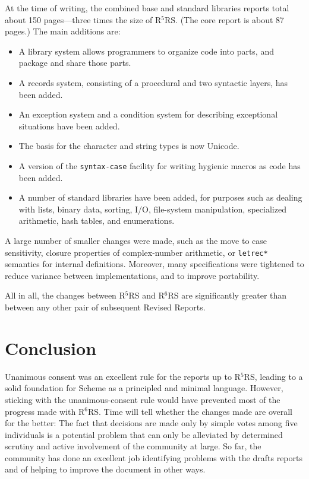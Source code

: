 \documentclass{acm_proc_article-sp}
\newcommand{\rn}[1]{R$^{#1}$RS}
\begin{document}
At the time of writing, the combined base and standard
libraries reports total about 150 pages---three times the size
of \rn{5}.  (The core report is about 87 pages.)  The main additions
are:
%
\begin{itemize}
\item A library system allows programmers to organize code into parts,
  and package and share those parts.
\item A records system, consisting of a procedural and two syntactic
  layers, has been added.
\item An exception system and a condition system for describing
  exceptional situations have been added.
\item The basis for the character and string types is now Unicode.
\item A version of the \texttt{syntax-case} facility for writing
  hygienic macros as code has been added.
\item A number of standard libraries have been added, for purposes
  such as dealing with lists, binary data, sorting, I/O, file-system
  manipulation, specialized arithmetic, hash tables, and enumerations.
\end{itemize}
%
A large number of smaller changes were made, such as the move to case
sensitivity, closure properties of complex-number arithmetic, or
\texttt{letrec*} semantics for internal definitions.  Moreover, many
specifications were tightened to reduce variance between
implementations, and to improve portability.

All in all, the changes between \rn{5} and \rn{6} are significantly
greater than between any other pair of subsequent Revised
Reports.

\section{Conclusion}
\label{sec:conclusion}

Unanimous consent was an excellent rule for the reports up to \rn{5},
leading to a solid foundation for Scheme as a principled and minimal
language.  However, sticking with the unanimous-consent rule would
have prevented most of the progress made with \rn{6}.  Time will tell
whether the changes made are overall for the better: The fact that
decisions are made only by simple votes among five individuals is a
potential problem that can only be alleviated by determined scrutiny
and active involvement of the community at large.  So far, the
community has done an excellent job identifying problems with the
drafts reports and of helping to improve the document in other ways.
\end{document}
